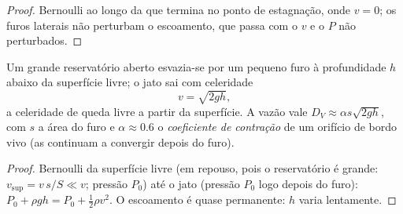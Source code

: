 \begin{proof}
Bernoulli ao longo da  que termina no ponto de estagnação, onde
$v = 0$; os furos laterais não perturbam o escoamento, que passa com o
$v$ e o $P$ não perturbados.
\end{proof}

\begin{proposition}\label{prop:b2:euler-bernoulli:torricelli}
Um grande reservatório aberto esvazia-se por um pequeno furo à profundidade $h$ abaixo da
superfície livre; o jato sai com celeridade
\[
v = \sqrt{2gh} ,
\]
a celeridade de queda livre a partir da superfície. A vazão vale $D_V \approx
\alpha s\sqrt{2gh}$, com $s$ a área do furo e $\alpha \approx 0.6$ o
\emph{coeficiente de contração} de um orifício de bordo vivo (as 
continuam a convergir depois do furo).
\end{proposition}

\begin{proof}
Bernoulli da superfície livre (em repouso, pois o reservatório é grande:
$v_{\text{sup}} = v\,s/S \ll v$; pressão $P_0$) até o jato (pressão $P_0$
logo depois do furo): $P_0 + \rho gh = P_0 + \tfrac12\rho v^2$. O escoamento
é quase permanente: $h$ varia lentamente.
\end{proof}

